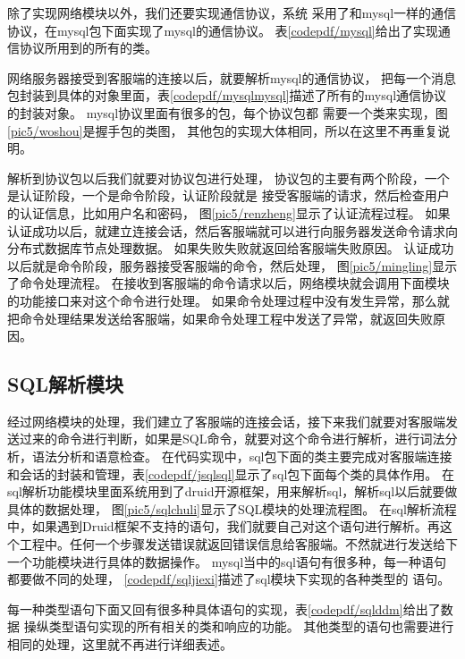 除了实现网络模块以外，我们还要实现通信协议，系统
采用了和mysql一样的通信协议，在mysql包下面实现了mysql的通信协议。
表\ref{codepdf/mysql}给出了实现通信协议所用到的所有的类。

网络服务器接受到客服端的连接以后，就要解析mysql的通信协议，
把每一个消息包封装到具体的对象里面，表\ref{codepdf/mysqlmysql}描述了所有的mysql通信协议的封装对象。
mysql协议里面有很多的包，每个协议包都
需要一个类来实现，图\ref{pic5/woshou}是握手包的类图，
其他包的实现大体相同，所以在这里不再重复说明。

解析到协议包以后我们就要对协议包进行处理，
协议包的主要有两个阶段，一个是认证阶段，一个是命令阶段，认证阶段就是
接受客服端的请求，然后检查用户的认证信息，比如用户名和密码，
图\ref{pic5/renzheng}显示了认证流程过程。
如果认证成功以后，就建立连接会话，然后客服端就可以进行向服务器发送命令请求向分布式数据库节点处理数据。
如果失败失败就返回给客服端失败原因。
认证成功以后就是命令阶段，服务器接受客服端的命令，然后处理，
图\ref{pic5/mingling}显示了命令处理流程。
在接收到客服端的命令请求以后，网络模块就会调用下面模块的功能接口来对这个命令进行处理。
如果命令处理过程中没有发生异常，那么就把命令处理结果发送给客服端，如果命令处理工程中发送了异常，就返回失败原因。
\subsection{SQL解析模块}
经过网络模块的处理，我们建立了客服端的连接会话，接下来我们就要对客服端发送过来的命令进行判断，如果是SQL命令，就要对这个命令进行解析，进行词法分析，语法分析和语意检查。
在代码实现中，sql包下面的类主要完成对客服端连接和会话的封装和管理，表\ref{codepdf/jsqlsql}显示了sql包下面每个类的具体作用。
在sql解析功能模块里面系统用到了druid开源框架，用来解析sql，解析sql以后就要做具体的数据处理，
图\ref{pic5/sqlchuli}显示了SQL模块的处理流程图。
在sql解析流程中，如果遇到Druid框架不支持的语句，我们就要自己对这个语句进行解析。再这个工程中。任何一个步骤发送错误就返回错误信息给客服端。不然就进行发送给下一个功能模块进行具体的数据操作。
mysql当中的sql语句有很多种，每一种语句都要做不同的处理，
\ref{codepdf/sqljiexi}描述了sql模块下实现的各种类型的
语句。

每一种类型语句下面又回有很多种具体语句的实现，表\ref{codepdf/sqlddm}给出了数据
操纵类型语句实现的所有相关的类和响应的功能。
其他类型的语句也需要进行相同的处理，这里就不再进行详细表述。
